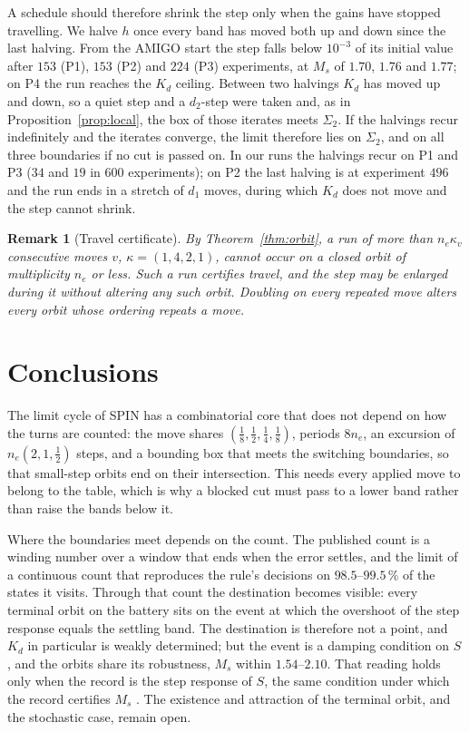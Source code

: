 \documentclass[letterpaper, 10 pt, conference]{ieeeconf}
\newtheorem{remark}{Remark}
\newcommand{\spin}{SPIN}
\begin{document}
A schedule should therefore shrink the step only when the gains have stopped
travelling. We halve $h$ once every band has moved both up and down since the
last halving. From the AMIGO start the step falls below $10^{-3}$ of its
initial value after $153$ (P1), $153$ (P2) and $224$ (P3) experiments, at
$M_s$ of $1.70$, $1.76$ and $1.77$; on P4 the run reaches the $K_d$ ceiling.
Between two halvings $K_d$ has moved up and down, so a quiet step and a
$d_2$-step were taken and, as in Proposition~\ref{prop:local}, the box of those
iterates meets $\Sigma_2$. If the halvings recur indefinitely and the
iterates converge, the limit therefore lies on $\Sigma_2$, and on all three
boundaries if no cut is passed on. In our runs the halvings recur on P1 and P3
($34$ and $19$ in $600$ experiments); on P2 the last halving is at experiment
$496$ and the run ends in a stretch of $d_1$ moves, during which $K_d$ does not
move and the step cannot shrink.

\begin{remark}[Travel certificate]
By Theorem~\ref{thm:orbit}, a run of more than $n_e \kappa_v$ consecutive moves
$v$, $\kappa = (1, 4, 2, 1)$, cannot occur on a closed orbit of multiplicity
$n_e$ or less. Such a run certifies travel, and the step may be enlarged
during it without altering any such orbit. Doubling on every repeated move
alters every orbit whose ordering repeats a move.
\end{remark}

\section{Conclusions}

The limit cycle of \spin{} has a combinatorial core that does not depend on
how the turns are counted: the move shares
$(\tfrac18, \tfrac12, \tfrac14, \tfrac18)$, periods $8 n_e$, an excursion of
$n_e (2, 1, \tfrac12)$ steps, and a bounding box that meets the switching
boundaries, so that small-step orbits end on their intersection. This needs
every applied move to belong to the table, which is why a blocked cut must
pass to a lower band rather than raise the bands below it.

Where the boundaries meet depends on the count. The published count is a
winding number over a window that ends when the error settles, and the limit
of a continuous count that reproduces the rule's decisions on
$98.5$--$99.5\,\%$ of the states it visits. Through that count the destination
becomes visible: every terminal orbit on the battery sits on the event at
which the overshoot of the step response equals the settling band. The
destination is therefore not a point, and $K_d$ in particular is weakly
determined; but the event is a damping condition on $S$, and the orbits share
its robustness, $M_s$ within $1.54$--$2.10$. That reading holds only when the
record is the step response of $S$, the same condition under which the record
certifies $M_s$ \cite{Certified}. The existence and attraction of the
terminal orbit, and the stochastic case, remain open.
\end{document}
